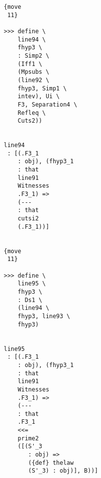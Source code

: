 \documentclass[12pt]{article}
\begin{document}
\begin{verbatim}
                                    {move 
                                     11}

                                    >>> define \
                                        line94 \
                                        fhyp3 \
                                        : Simp2 \
                                        (Iff1 \
                                        (Mpsubs \
                                        (line92 \
                                        fhyp3, Simp1 \
                                        intev), Ui \
                                        F3, Separation4 \
                                        Refleq \
                                        Cuts2))


                                    line94 
                                     : [(.F3_1 
                                        : obj), (fhyp3_1 
                                        : that 
                                        line91 
                                        Witnesses 
                                        .F3_1) => 
                                        (--- 
                                        : that 
                                        cutsi2 
                                        (.F3_1))]


                                    {move 
                                     11}

                                    >>> define \
                                        line95 \
                                        fhyp3 \
                                        : Ds1 \
                                        (line94 \
                                        fhyp3, line93 \
                                        fhyp3)


                                    line95 
                                     : [(.F3_1 
                                        : obj), (fhyp3_1 
                                        : that 
                                        line91 
                                        Witnesses 
                                        .F3_1) => 
                                        (--- 
                                        : that 
                                        .F3_1 
                                        <<= 
                                        prime2 
                                        ([(S'_3 
                                           : obj) => 
                                           ({def} thelaw 
                                           (S'_3) : obj)], B))]



\end{verbatim}
\end{document}
